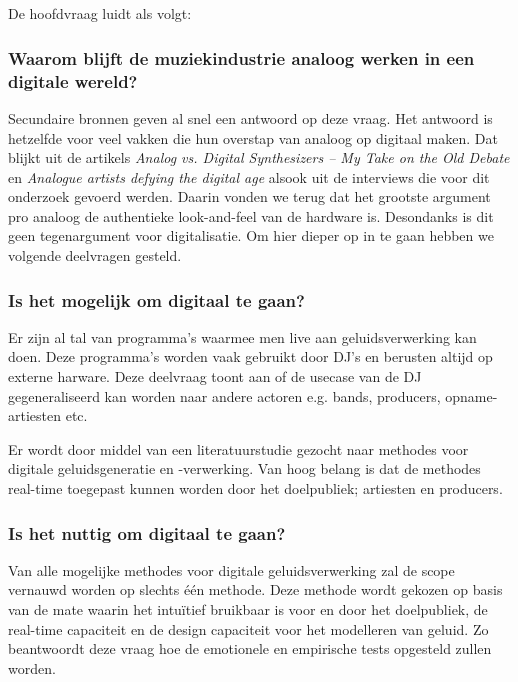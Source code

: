 \section{}
\label{sec:onderzoeksvragen}

De hoofdvraag luidt als volgt:

\subsubsection{Waarom blijft de muziekindustrie analoog werken in een digitale wereld?}

Secundaire bronnen geven al snel een antwoord op deze vraag. Het antwoord is hetzelfde voor veel vakken die hun overstap van analoog op digitaal maken. Dat blijkt uit de artikels \textit{Analog vs. Digital Synthesizers – My Take on the Old Debate} \autocite{juliusdobos} en \textit{Analogue artists defying the digital age} \autocite{GuardianOpinion} alsook uit de interviews die voor dit onderzoek gevoerd werden. Daarin vonden we terug dat het grootste argument pro analoog de authentieke look-and-feel van de hardware is. Desondanks is dit geen tegenargument voor digitalisatie. Om hier dieper op in te gaan hebben we volgende deelvragen gesteld.

\subsubsection{Is het mogelijk om digitaal te gaan?}

Er zijn al tal van programma's waarmee men live aan geluidsverwerking kan doen. Deze programma's worden vaak gebruikt door DJ's en berusten altijd op externe harware. Deze deelvraag toont aan of de usecase van de DJ gegeneraliseerd kan worden naar andere actoren e.g. bands, producers, opname-artiesten etc.

Er wordt door middel van een literatuurstudie gezocht naar methodes voor digitale geluidsgeneratie en -verwerking. Van hoog belang is dat de methodes real-time toegepast kunnen worden door het doelpubliek; artiesten en producers.

\subsubsection{Is het nuttig om digitaal te gaan?}

Van alle mogelijke methodes voor digitale geluidsverwerking zal de scope vernauwd worden op slechts één methode. Deze methode wordt gekozen op basis van de mate waarin het intuïtief bruikbaar is voor en door het doelpubliek, de real-time capaciteit en de design capaciteit voor het modelleren van geluid.
Zo beantwoordt deze vraag hoe de emotionele en empirische tests opgesteld zullen worden.

